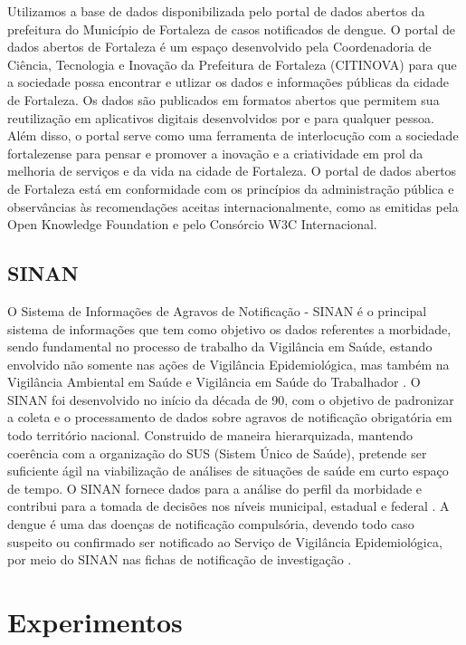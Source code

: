 \documentclass[
	12pt,				%
	openright,			%
	oneside,	
	a4paper,				%
	english,				%
	brazil				%
]{abntex2/abntex2} %
\begin{document}
	Utilizamos a base de dados disponibilizada pelo portal de dados abertos da prefeitura do Município de Fortaleza de casos notificados de dengue. O portal de dados abertos de Fortaleza é um espaço desenvolvido pela Coordenadoria de Ciência, Tecnologia e Inovação da Prefeitura de Fortaleza (CITINOVA) para que a sociedade possa encontrar e utlizar os dados e informações públicas da cidade de Fortaleza. Os dados são publicados em formatos abertos que permitem sua reutilização em aplicativos digitais desenvolvidos por e para qualquer pessoa. Além disso, o portal serve como uma ferramenta de interlocução com a sociedade fortalezense para pensar e promover  a inovação e a criatividade em prol da melhoria de serviços e da vida na cidade de Fortaleza. O portal de dados abertos de Fortaleza está em conformidade com os princípios da administração pública e observâncias às recomendações aceitas internacionalmente, como as emitidas pela Open Knowledge Foundation e pelo Consórcio W3C Internacional.
		
		
	\section{SINAN}
	
	O Sistema de Informações de Agravos de Notificação - SINAN é o principal sistema de informações que tem como objetivo os dados referentes a morbidade, sendo fundamental no processo de trabalho da Vigilância em Saúde, estando envolvido não somente nas ações de Vigilância Epidemiológica, mas também na Vigilância Ambiental em Saúde e Vigilância em Saúde do Trabalhador \cite{conass:2015}.
	O SINAN foi desenvolvido no início da década de 90, com o objetivo de padronizar a coleta e o processamento de dados sobre agravos de notificação obrigatória em todo território nacional. Construido de maneira hierarquizada, mantendo coerência com a organização do SUS (Sistem Único de Saúde), pretende ser suficiente ágil na viabilização de análises de situações de saúde em curto espaço de tempo. O SINAN fornece dados para a análise do perfil da morbidade e contribui para a tomada de decisões nos níveis municipal, estadual e federal \cite{saude:2008}.
	A dengue é uma das doenças de notificação compulsória, devendo todo caso suspeito ou confirmado ser notificado ao Serviço de Vigilância Epidemiológica, por meio do SINAN nas fichas de notificação de investigação \cite{saude:2008}.
	
	
\chapter{Experimentos}
\end{document}
